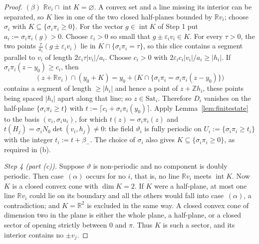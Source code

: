 \documentclass[11pt,reqno]{amsart}
\theoremstyle{plain}
\theoremstyle{definition}
\theoremstyle{remark}
\theoremstyle{plain}
\theoremstyle{remark}
\theoremstyle{definition}
\numberwithin{equation}{section}
\newcommand{\R}{\mathbb{R}}
\newcommand{\Z}{\mathbb{Z}}
\begin{document}
\begin{proof}
$(\beta)$ $\R v_i\cap\operatorname{int}K=\varnothing$.  A convex set
and a line missing its interior can be separated, so $K$ lies in one of the two
closed half-planes bounded by $\R v_i$; choose $\sigma_i$ with
$K\subseteq\{\sigma_i\pi_i\ge0\}$.  For the vector
$g\in\operatorname{int}K$ of Step 1 put $a_i:=\sigma_i\pi_i(g)>0$.
Choose $\varepsilon_i>0$ so small that $g\pm\varepsilon_i v_i\in K$.
For every $\tau>0$, the two points
$\frac{\tau}{a_i}(g\pm\varepsilon_i v_i)$ lie in
$K\cap\{\sigma_i\pi_i=\tau\}$, so this slice contains a segment parallel to
$v_i$ of length $2\varepsilon_i\tau|v_i|/a_i$.
Choose $c_i>0$ with $2\varepsilon_i c_i|v_i|/a_i\ge|h_i|$.
If $\sigma_i\pi_i(z-y_0)\ge c_i$, then
\[(z+\R v_i)\cap(y_0+K)=y_0+\bigl(K\cap\{\sigma_i\pi_i
  =\sigma_i\pi_i(z-y_0)\}\bigr)\]
contains a segment of length $\ge|h_i|$ and hence a point of $z+\Z h_i$, these
points being spaced $|h_i|$ apart along that line; so $z\in\mathrm{Sat}_i$.
Therefore $D_i$ vanishes on the half-plane $\{\sigma_i\pi_i\ge t\}$ with
$t:=\lceil c_i+\sigma_i\pi_i(y_0)\rceil$.  Apply Lemma~\ref{lem:finitestate} to the basis
$(v_i,\sigma_iu_i)$, for which $t(z)=\sigma_i\pi_i(z)$ and
$t(H_j)=\sigma_iN_0\det(v_i,h_j)\ne0$: the field $\vartheta_i$ is fully periodic
on $U_i:=\{\sigma_i\pi_i\ge t_i\}$ with the integer $t_i:=t+\beta_-$.
The choice of $\sigma_i$ also gives $K\subseteq\{\sigma_i\pi_i\ge0\}$,
as required in (b).

\emph{Step 4 (part (c)).}  Suppose $\vartheta$ is non-periodic and no component
is doubly periodic.  Then case~$(\alpha)$ occurs for no $i$, that is, no line
$\R v_i$ meets $\operatorname{int}K$.  Now $K$ is a closed convex cone with
$\dim K=2$.  If $K$ were a half-plane, at most one line $\R v_i$ could lie on
its boundary and all the others would fall into case~$(\alpha)$, a
contradiction; and $K=\R^2$ is excluded in the same way.  A closed convex cone
of dimension two in the plane is either the whole plane, a half-plane, or a
closed sector of opening strictly between $0$ and $\pi$.  Thus $K$ is such a
sector, and its interior contains no $\pm v_j$.
\end{proof}
\end{document}
